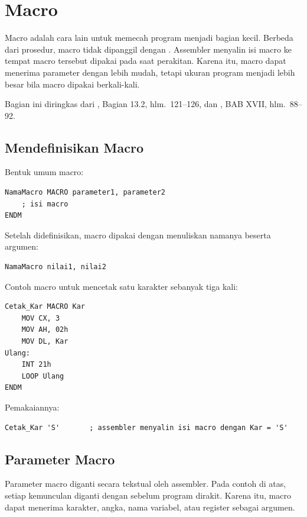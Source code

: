 \section{Macro}
\label{sec:macro}

Macro adalah cara lain untuk memecah program menjadi bagian kecil.
Berbeda dari prosedur, macro tidak dipanggil dengan .
Assembler menyalin isi macro ke tempat macro tersebut dipakai pada
saat perakitan. Karena itu, macro dapat menerima parameter dengan
lebih mudah, tetapi ukuran program menjadi lebih besar bila macro
dipakai berkali-kali.

Bagian ini diringkas dari \cite{gunawan2019}, Bagian 13.2,
hlm.~121--126, dan \cite{sto2001}, BAB XVII, hlm.~88--92.

\subsection{Mendefinisikan Macro}

Bentuk umum macro:

\begin{lstlisting}[language=MASM, numbers=none]
NamaMacro MACRO parameter1, parameter2
    ; isi macro
ENDM
\end{lstlisting}

Setelah didefinisikan, macro dipakai dengan menuliskan namanya
beserta argumen:

\begin{lstlisting}[language=MASM, numbers=none]
NamaMacro nilai1, nilai2
\end{lstlisting}

Contoh macro untuk mencetak satu karakter sebanyak tiga kali:

\begin{lstlisting}[language=MASM, numbers=none]
Cetak_Kar MACRO Kar
    MOV CX, 3
    MOV AH, 02h
    MOV DL, Kar
Ulang:
    INT 21h
    LOOP Ulang
ENDM
\end{lstlisting}

Pemakaiannya:

\begin{lstlisting}[language=MASM, numbers=none]
Cetak_Kar 'S'       ; assembler menyalin isi macro dengan Kar = 'S'
\end{lstlisting}

\subsection{Parameter Macro}

Parameter macro diganti secara tekstual oleh assembler. Pada contoh
di atas, setiap kemunculan  diganti dengan 
sebelum program dirakit. Karena itu, macro dapat menerima karakter,
angka, nama variabel, atau register sebagai argumen.


